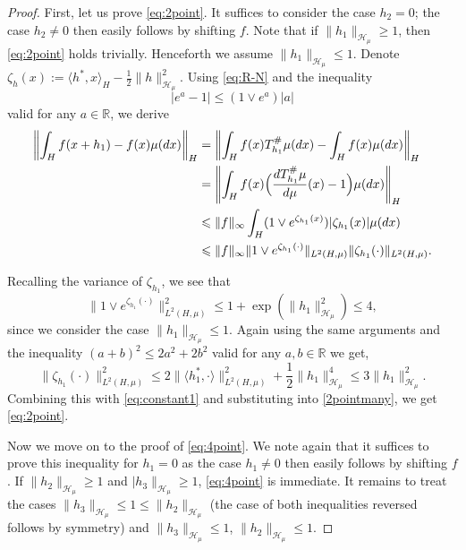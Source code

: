 \documentclass[10pt,a4paper]{amsart}
\newcommand{\CM}{\H_\mu}
\renewcommand{\H}{\mathcal{H}}
\newcommand{\R}{\mathbb{R}}
\renewcommand{\ge}{\geqslant}
\renewcommand{\le}{\leqslant}
\newcommand{\nn}{\nonumber}
\begin{document}
\begin{proof}
First, let us prove  \eqref{eq:2point}.
It suffices to consider the case $h_2=0$; the case $h_2\neq 0$ then easily follows by shifting $f$. Note that if $\|h_1\|_{\CM}\geqslant 1$, then \eqref{eq:2point} holds trivially. Henceforth we assume $\|h_1\|_{\CM}\le1$. Denote $\zeta_h(x):=\langle h^*,x\rangle_H-\frac{1}{2}\|h\|_{\CM}^2$. 
Using \eqref{eq:R-N} and the inequality
\begin{equation}\label{eq:very-triv}
     |e^{a}-1|\le (1\vee e^{a})|a|
\end{equation}
valid for any $a\in \R$, we derive
\begin{align}\label{2pointmany}
\left\|\int_H f(x+h_1)-f(x)\mu(dx)\right\|_{H}&=\left\|\int_H f(x)  T_{h_1}^\#\mu (dx)-\int_H f(x)\mu(dx)\right\|_{H}\nn\\
&=\left\|\int_H f(x)\Bigl(\frac{d T_{h_1}^\# \mu}{d \mu}(x)-1\Bigr) \mu(dx)\right\|_{H}\nn\\
&\leqslant \|f\|_\infty \int_H (1\vee e^{\zeta_{h_1}(x)}) |\zeta_{h_1}(x)|\mu(dx)\nn\\
&\leqslant \|f\|_\infty \|1\vee e^{\zeta_{h_1}(\cdot)}\|_{L^2(H,\mu)} \|\zeta_{h_1}(\cdot)\|_{L^2(H,\mu)}.
\end{align}


Recalling the variance of $\zeta_{h_1}$, we see that 
\begin{equation}\label{eq:constant1}
\|1\vee e^{\zeta_{h_1}(\cdot)}\|_{L^2(H,\mu)}^2
\le 1+\exp(\|h_1\|^2_{\CM})\le 4,
\end{equation}
since we consider the case $\|h_1\|_{\CM}\le1$. 
Again using the same arguments and the inequality $(a+b)^2\le 2 a^2 +2 b^2$ valid for any $a,b\in\R$ we get,
\begin{equation}\label{eq:constant2}
\|\zeta_{h_1}(\cdot)\|_{L^2(H,\mu)}^2\le 2 
 \|\langle h_1^*,\cdot\rangle \|_{L^2(H,\mu)}^2 +\frac12\|h_1\|_{\CM}^4 \le 3\|h_1\|_{\CM}^2.
\end{equation}
Combining this with \eqref{eq:constant1} and substituting into \eqref{2pointmany}, we get  \eqref{eq:2point}.

Now we move on to the proof of  \eqref{eq:4point}. We note again that it suffices to prove this inequality  for $h_1=0$ as the case $h_1\neq 0$ then easily follows by shifting $f$. If $\|h_2\|_{\CM}\ge1$ and $|h_3\|_{\CM}\ge 1$, \eqref{eq:4point} is immediate.
It remains to treat the cases $\|h_3\|_{\CM}\leqslant 1 \leqslant \|h_2\|_{\CM}$ (the case of both inequalities reversed follows by symmetry) and $\|h_3\|_{\CM}\le 1$, $\|h_2\|_{\CM} \leqslant 1$.


\end{proof}
\end{document}
